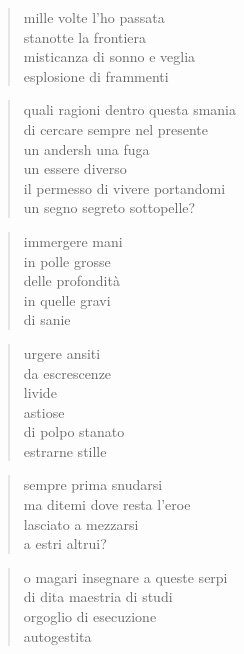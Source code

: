 	\begin{verse}
                mille volte l’ho passata\\
                stanotte la frontiera\\
                misticanza di sonno e veglia\\
                esplosione di frammenti
	\end{verse}

	\begin{verse}
                quali ragioni dentro questa smania\\
                di cercare sempre nel presente\\
                un andersh una fuga\\
                un essere diverso\\
                il permesso di vivere portandomi\\
                un segno segreto sottopelle?
	\end{verse}

\clearpage


\vspace*{2cm}

	\begin{verse}
		immergere mani\\
		in polle grosse\\
		delle profondità\\
		in quelle gravi\\
		di sanie
	\end{verse}

	\begin{verse}
		urgere ansiti\\
		da escrescenze\\
		livide\\
		astiose\\
		di polpo stanato\\
		estrarne stille
	\end{verse}

	\begin{verse}
		sempre prima snudarsi\\
		ma ditemi dove resta l’eroe\\
		lasciato a mezzarsi\\
		a estri altrui?
	\end{verse}

	\begin{verse}
		o magari insegnare a queste serpi\\
		di dita maestria di studi\\
		orgoglio di esecuzione\\
		autogestita
	\end{verse}

